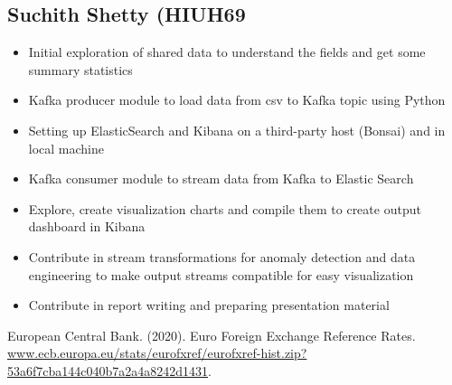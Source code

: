 \documentclass{article}
\begin{document}
\subsection{Suchith Shetty (HIUH69}
\begin{itemize}
    \item Initial exploration of shared data to understand the fields and get some summary statistics
    \item Kafka producer module to load data from csv to Kafka topic using Python
    \item Setting up ElasticSearch and Kibana on a third-party host (Bonsai) and in local machine
    \item Kafka consumer module to stream data from Kafka to Elastic Search
    \item Explore, create visualization charts and compile them to create output dashboard in Kibana
    \item Contribute in stream transformations for anomaly detection and data engineering to make output streams compatible for easy visualization
    \item Contribute in report writing and preparing presentation material
\end{itemize}


\begin{thebibliography}{9}

European Central Bank. (2020). Euro Foreign Exchange Reference Rates. \url{www.ecb.europa.eu/stats/eurofxref/eurofxref-hist.zip?53a6f7cba144c040b7a2a4a8242d1431}.

\end{thebibliography}
\end{document}
